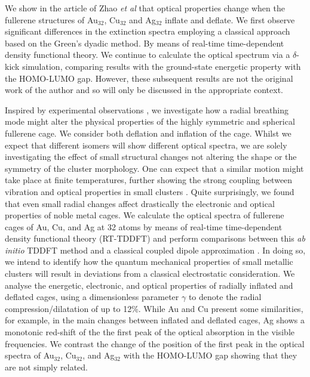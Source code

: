 We show in the article of Zhao \textit{et al} \cite{Wei} that optical properties change when the fullerene structures of Au$_{32}$, Cu$_{32}$ and Ag$_{32}$ inflate and deflate. We first observe significant differences in the extinction spectra employing a classical approach based on the Green's dyadic method. By means of real-time time-dependent density functional theory. We continue to calculate the optical spectrum via a $\delta$-kick simulation, comparing results with the ground-state energetic property with the HOMO-LUMO gap. However, these subsequent results are not the original work of the author and so will only be discussed in the appropriate context.

Inspired by experimental observations \cite{Maioli2018,Quasi_Breathe}, we investigate how a radial breathing mode might alter the physical properties of the highly symmetric and spherical fullerene cage. We consider both deflation and inflation of the cage. Whilst we expect that different isomers will show different optical spectra, we are solely investigating the effect of small structural changes not altering the shape or the symmetry of the cluster morphology. One can expect that a similar motion might take place at finite temperatures, further showing the strong coupling between vibration and optical properties in small clusters \cite{Liu2021}. Quite surprisingly, we found that even small radial changes affect drastically the electronic and optical properties of noble metal cages. We calculate the optical spectra of fullerene cages of Au, Cu, and Ag at 32 atoms by means of real-time time-dependent density functional theory (RT-TDDFT) and perform comparisons between this \textit{ab initio} TDDFT method and a classical coupled dipole approximation \cite{Ullrich2012}. In doing so, we intend to identify how the quantum mechanical properties of small metallic clusters will result in deviations from a classical electrostatic consideration. We analyse the energetic, electronic, and optical properties of radially inflated and deflated cages, using a dimensionless parameter $\gamma$ to denote the radial compression/dilatation of up to 12\%.
While Au and Cu present some similarities, for example, in the main changes between inflated and deflated cages, Ag shows a monotonic red-shift of the the first peak of the optical absorption in the visible frequencies. We contrast the change of the position of the first peak in the optical spectra of Au$_{32}$, Cu$_{32}$, and Ag$_{32}$ with the HOMO-LUMO gap showing that they are not simply related.

